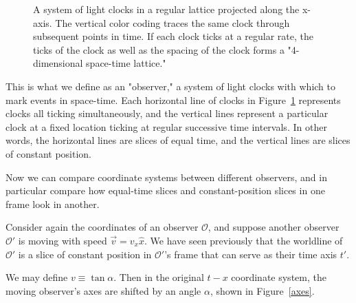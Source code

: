\documentclass[11pt]{article}
\begin{document}
\begin{figure}[]
	\caption{A system of light clocks in a regular lattice projected along the x-axis. The vertical color coding traces the same clock through subsequent points in time. If each clock ticks at a regular rate, the ticks of the clock as well as the spacing of the clock forms a "4-dimensional space-time lattice."}
	\label{clocks}
\end{figure}

This is what we define as an "observer," a system of light clocks with which to mark events in space-time. Each horizontal line of clocks in Figure~\ref{clocks} represents clocks all ticking simultaneously, and the vertical lines represent a particular clock at a fixed location ticking at regular successive time intervals. In other words, the horizontal lines are slices of equal time, and the vertical lines are slices of constant position.

Now we can compare coordinate systems between different observers, and in particular compare how equal-time slices and constant-position slices in one frame look in another.

Consider again the coordinates of an observer $\mathcal{O}$, and suppose another observer $\mathcal{O'}$ is moving with speed $\vec{v} = v_x \hat{x}$. We have seen previously that the worldline of $\mathcal{O'}$ is a slice of constant position in $\mathcal{O'}$'s frame that can serve as their time axis $t'$.

We may define $v \equiv \tan \alpha$. Then in the original $t-x$ coordinate system, the moving observer's axes are shifted by an angle $\alpha$, shown in Figure~\ref{axes}.
\end{document}
